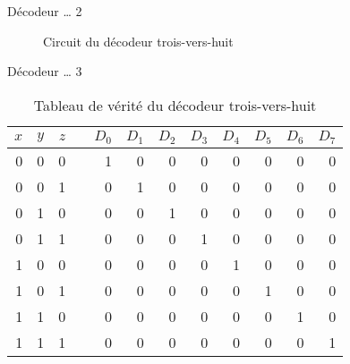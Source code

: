 \documentclass[presentation]{beamer}
\begin{document}
\begin{frame}[label={sec:orgd52ce10}]{Décodeur \ldots{} 2}
\begin{figure}[htbp]
\centering

\caption{\label{fig:orgf6f1971}Circuit du décodeur trois-vers-huit}
\end{figure}
\end{frame}

\begin{frame}[label={sec:orgd2f3ff3}]{Décodeur \ldots{} 3}
\begin{table}[htbp]
\caption{\label{tab:org758580d}Tableau de vérité du décodeur trois-vers-huit}
\centering
\begin{tabular}{rrrlrrrrrrrr}
\(x\) & \(y\) & \(z\) &  & \(D_0\) & \(D_1\) & \(D_2\) & \(D_3\) & \(D_4\) & \(D_5\) & \(D_6\) & \(D_7\)\\[0pt]
\hline
0 & 0 & 0 &  & 1 & 0 & 0 & 0 & 0 & 0 & 0 & 0\\[0pt]
0 & 0 & 1 &  & 0 & 1 & 0 & 0 & 0 & 0 & 0 & 0\\[0pt]
0 & 1 & 0 &  & 0 & 0 & 1 & 0 & 0 & 0 & 0 & 0\\[0pt]
0 & 1 & 1 &  & 0 & 0 & 0 & 1 & 0 & 0 & 0 & 0\\[0pt]
1 & 0 & 0 &  & 0 & 0 & 0 & 0 & 1 & 0 & 0 & 0\\[0pt]
1 & 0 & 1 &  & 0 & 0 & 0 & 0 & 0 & 1 & 0 & 0\\[0pt]
1 & 1 & 0 &  & 0 & 0 & 0 & 0 & 0 & 0 & 1 & 0\\[0pt]
1 & 1 & 1 &  & 0 & 0 & 0 & 0 & 0 & 0 & 0 & 1\\[0pt]
\end{tabular}
\end{table}
\end{frame}
\end{document}
